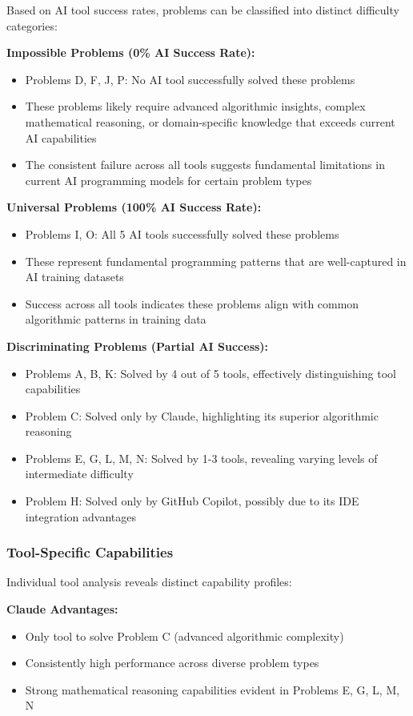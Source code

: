 \documentclass[conference]{IEEEtran}
\begin{document}
Based on AI tool success rates, problems can be classified into distinct difficulty categories:

\textbf{Impossible Problems (0\% AI Success Rate):}
\begin{itemize}
    \item Problems D, F, J, P: No AI tool successfully solved these problems
    \item These problems likely require advanced algorithmic insights, complex mathematical reasoning, or domain-specific knowledge that exceeds current AI capabilities
    \item The consistent failure across all tools suggests fundamental limitations in current AI programming models for certain problem types
\end{itemize}

\textbf{Universal Problems (100\% AI Success Rate):}
\begin{itemize}
    \item Problems I, O: All 5 AI tools successfully solved these problems
    \item These represent fundamental programming patterns that are well-captured in AI training datasets
    \item Success across all tools indicates these problems align with common algorithmic patterns in training data
\end{itemize}

\textbf{Discriminating Problems (Partial AI Success):}
\begin{itemize}
    \item Problems A, B, K: Solved by 4 out of 5 tools, effectively distinguishing tool capabilities
    \item Problem C: Solved only by Claude, highlighting its superior algorithmic reasoning
    \item Problems E, G, L, M, N: Solved by 1-3 tools, revealing varying levels of intermediate difficulty
    \item Problem H: Solved only by GitHub Copilot, possibly due to its IDE integration advantages
\end{itemize}

\subsubsection{Tool-Specific Capabilities}

Individual tool analysis reveals distinct capability profiles:

\textbf{Claude Advantages:}
\begin{itemize}
    \item Only tool to solve Problem C (advanced algorithmic complexity)
    \item Consistently high performance across diverse problem types
    \item Strong mathematical reasoning capabilities evident in Problems E, G, L, M, N
\end{itemize}
\end{document}
